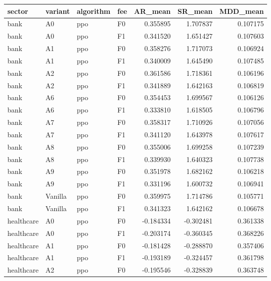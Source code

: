 \begin{tabular}{llllrrr}
\toprule
    sector & variant & algorithm & fee &   AR\_mean &   SR\_mean &  MDD\_mean \\
\midrule
      bank &      A0 &       ppo &  F0 &  0.355895 &  1.707837 &  0.107175 \\
      bank &      A0 &       ppo &  F1 &  0.341520 &  1.651427 &  0.107603 \\
      bank &      A1 &       ppo &  F0 &  0.358276 &  1.717073 &  0.106924 \\
      bank &      A1 &       ppo &  F1 &  0.340009 &  1.645490 &  0.107485 \\
      bank &      A2 &       ppo &  F0 &  0.361586 &  1.718361 &  0.106196 \\
      bank &      A2 &       ppo &  F1 &  0.341889 &  1.642163 &  0.106819 \\
      bank &      A6 &       ppo &  F0 &  0.354453 &  1.699567 &  0.106126 \\
      bank &      A6 &       ppo &  F1 &  0.333810 &  1.618505 &  0.106796 \\
      bank &      A7 &       ppo &  F0 &  0.358317 &  1.710926 &  0.107056 \\
      bank &      A7 &       ppo &  F1 &  0.341120 &  1.643978 &  0.107617 \\
      bank &      A8 &       ppo &  F0 &  0.355006 &  1.699258 &  0.107239 \\
      bank &      A8 &       ppo &  F1 &  0.339930 &  1.640323 &  0.107738 \\
      bank &      A9 &       ppo &  F0 &  0.351978 &  1.682162 &  0.106218 \\
      bank &      A9 &       ppo &  F1 &  0.331196 &  1.600732 &  0.106941 \\
      bank & Vanilla &       ppo &  F0 &  0.359975 &  1.714786 &  0.105771 \\
      bank & Vanilla &       ppo &  F1 &  0.341323 &  1.642162 &  0.106678 \\
healthcare &      A0 &       ppo &  F0 & -0.184334 & -0.302481 &  0.361338 \\
healthcare &      A0 &       ppo &  F1 & -0.203174 & -0.360345 &  0.368226 \\
healthcare &      A1 &       ppo &  F0 & -0.181428 & -0.288870 &  0.357406 \\
healthcare &      A1 &       ppo &  F1 & -0.193189 & -0.324457 &  0.361798 \\
healthcare &      A2 &       ppo &  F0 & -0.195546 & -0.328839 &  0.363748 \\

\end{tabular}

